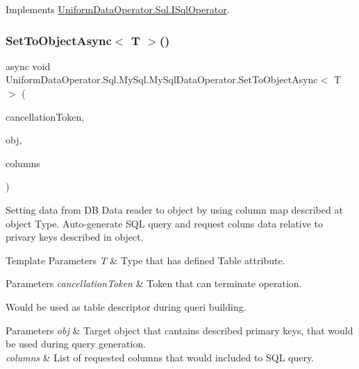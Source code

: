 Implements \mbox{\hyperlink{interface_uniform_data_operator_1_1_sql_1_1_i_sql_operator_af96d3f0bd2b58dfad705d2bfc3eba8fc}{Uniform\+Data\+Operator.\+Sql.\+I\+Sql\+Operator}}.

\mbox{\label{class_uniform_data_operator_1_1_sql_1_1_my_sql_1_1_my_sql_data_operator_ae3b550f82c725fa4f17d71f5f489dc10}} 
\subsubsection{\texorpdfstring{Set\+To\+Object\+Async$<$ T $>$()}{SetToObjectAsync< T >()}}
{\footnotesize\ttfamily async void Uniform\+Data\+Operator.\+Sql.\+My\+Sql.\+My\+Sql\+Data\+Operator.\+Set\+To\+Object\+Async$<$ T $>$ (\begin{DoxyParamCaption}\item[{Cancellation\+Token}]{cancellation\+Token,  }\item[{object}]{obj,  }\item[{params string \mbox{[}$\,$\mbox{]}}]{columns }\end{DoxyParamCaption})}



Setting data from DB Data reader to object by using column map described at object Type. Auto-\/generate S\+QL query and request coluns data relative to privary keys described in object. 


\begin{DoxyTemplParams}{Template Parameters}
{\em T} & Type that has defined Table attribute. 
\begin{DoxyParams}{Parameters}
{\em cancellation\+Token} & Token that can terminate operation.\\
\hline
\end{DoxyParams}
Would be used as table descriptor during queri building.\\
\hline
\end{DoxyTemplParams}

\begin{DoxyParams}{Parameters}
{\em obj} & Target object that cantains described primary keys, that would be used during query generation.\\
\hline
{\em columns} & List of requested columns that would included to S\+QL query.\\
\hline
\end{DoxyParams}


